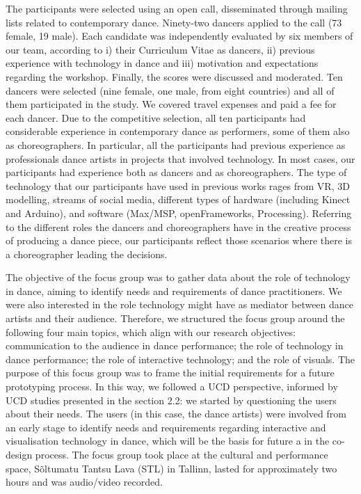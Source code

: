 The participants were selected using an open call, disseminated through mailing lists related to contemporary dance. Ninety-two dancers applied to the call (73 female, 19 male). Each candidate was independently evaluated by six members of our team, according to i) their Curriculum Vitae as dancers, ii) previous experience with technology in dance and iii) motivation and expectations regarding the workshop. Finally, the scores were discussed and moderated. Ten dancers were selected (nine female, one male, from eight countries) and all of them participated in the study. We covered travel expenses and paid a fee for each dancer. Due to the competitive selection, all ten participants had considerable experience in contemporary dance as performers, some of them also as choreographers.
In particular, all the participants had previous experience as professionals dance artists in projects that involved technology. In most cases, our participants had experience both as dancers and as choreographers. The type of technology that our participants have used in previous works rages from VR, 3D modelling, streams of social media, different types of hardware (including Kinect and Arduino), and software (Max/MSP, openFrameworks, Processing). Referring to the different roles the dancers and choreographers have in the creative process of producing a dance piece, our participants reflect those scenarios where there is a choreographer leading the decisions. 

The objective of the focus group was to gather data about the role of technology in dance, aiming to identify needs and requirements of dance practitioners. We were also interested in the role technology might have as mediator between dance artists and their audience. Therefore, we structured the focus group around the following four main topics, which align with our research objectives: communication to the audience in dance performance; the role of technology in dance performance; the role of interactive technology; and the role of visuals. The purpose of this focus group was to frame the initial requirements for a future prototyping process. In this way, we followed a UCD perspective, informed by UCD studies presented in the section 2.2: we started by questioning the users about their needs. 
The users (in this case, the dance artists) were involved from an early stage to identify needs and requirements regarding interactive and visualisation technology in dance, which will be the basis for future a in the co-design process. The focus group took place at the cultural and performance space, Sõltumatu Tantsu Lava (STL) in Tallinn, lasted for approximately two hours and was audio/video recorded. 

